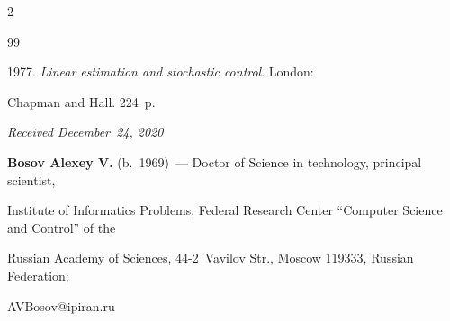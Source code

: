 \begin{multicols}{2}
{{\begin{thebibliography}{99}


       1977. \textit{Linear estimation and stochastic control}. London: 


Chapman and Hall. 224~p.


      \end{thebibliography}





 }


 }





\end{multicols}





\vspace*{-3pt}





  \hfill{\small\textit{Received December~24, 2020}}















      


      \Contrl


      


      \noindent


      \textbf{Bosov Alexey V.} (b.\ 1969)~--- Doctor of Science in technology, principal scientist, 


Institute of Informatics Problems, Federal Research Center ``Computer Science and Control'' of the 


Russian Academy of Sciences, 44-2~Vavilov Str., Moscow 119333, Russian Federation; 


\mbox{AVBosov@ipiran.ru}


      


      


\label{end\stat}





\renewcommand{\bibname}{\protect\rm Литература}


